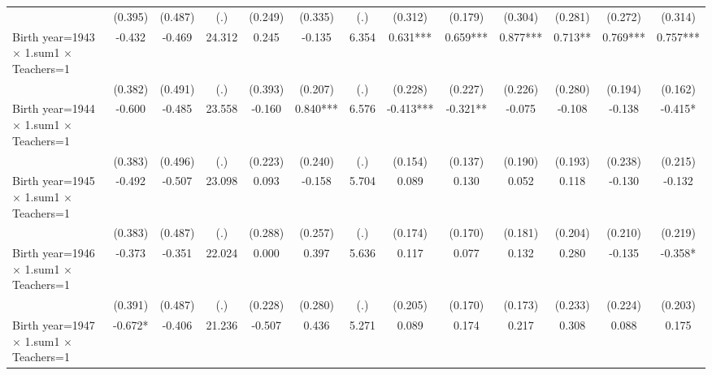 {\begin{tabular}{l*{12}{c}}
                    &     (0.395)   &     (0.487)   &         (.)   &     (0.249)   &     (0.335)   &         (.)   &     (0.312)   &     (0.179)   &     (0.304)   &     (0.281)   &     (0.272)   &     (0.314)   \\
Birth year=1943 $\times$ 1.sum1 $\times$ Teachers=1&      -0.432   &      -0.469   &      24.312   &       0.245   &      -0.135   &       6.354   &       0.631***&       0.659***&       0.877***&       0.713** &       0.769***&       0.757***\\
                    &     (0.382)   &     (0.491)   &         (.)   &     (0.393)   &     (0.207)   &         (.)   &     (0.228)   &     (0.227)   &     (0.226)   &     (0.280)   &     (0.194)   &     (0.162)   \\
Birth year=1944 $\times$ 1.sum1 $\times$ Teachers=1&      -0.600   &      -0.485   &      23.558   &      -0.160   &       0.840***&       6.576   &      -0.413***&      -0.321** &      -0.075   &      -0.108   &      -0.138   &      -0.415*  \\
                    &     (0.383)   &     (0.496)   &         (.)   &     (0.223)   &     (0.240)   &         (.)   &     (0.154)   &     (0.137)   &     (0.190)   &     (0.193)   &     (0.238)   &     (0.215)   \\
Birth year=1945 $\times$ 1.sum1 $\times$ Teachers=1&      -0.492   &      -0.507   &      23.098   &       0.093   &      -0.158   &       5.704   &       0.089   &       0.130   &       0.052   &       0.118   &      -0.130   &      -0.132   \\
                    &     (0.383)   &     (0.487)   &         (.)   &     (0.288)   &     (0.257)   &         (.)   &     (0.174)   &     (0.170)   &     (0.181)   &     (0.204)   &     (0.210)   &     (0.219)   \\
Birth year=1946 $\times$ 1.sum1 $\times$ Teachers=1&      -0.373   &      -0.351   &      22.024   &       0.000   &       0.397   &       5.636   &       0.117   &       0.077   &       0.132   &       0.280   &      -0.135   &      -0.358*  \\
                    &     (0.391)   &     (0.487)   &         (.)   &     (0.228)   &     (0.280)   &         (.)   &     (0.205)   &     (0.170)   &     (0.173)   &     (0.233)   &     (0.224)   &     (0.203)   \\
Birth year=1947 $\times$ 1.sum1 $\times$ Teachers=1&      -0.672*  &      -0.406   &      21.236   &      -0.507   &       0.436   &       5.271   &       0.089   &       0.174   &       0.217   &       0.308   &       0.088   &       0.175   \\

\end{tabular}}
